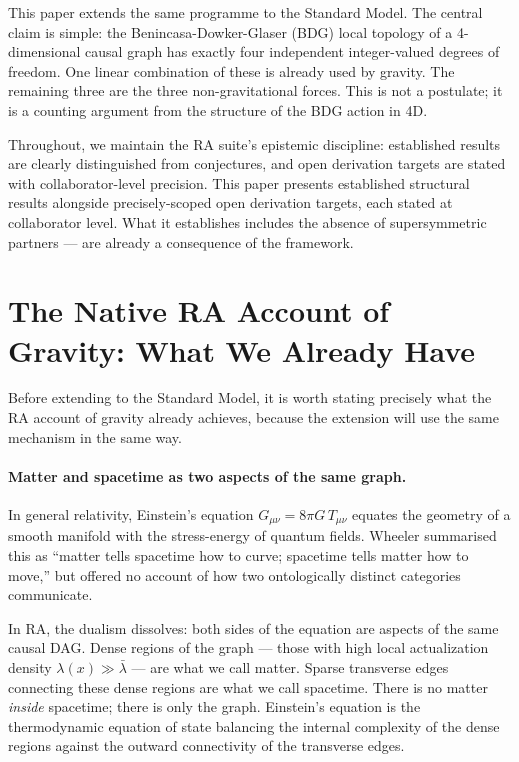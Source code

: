 \documentclass[11pt,a4paper]{article}
\begin{document}
This paper extends the same programme to the Standard Model. The central claim
is simple: the Benincasa-Dowker-Glaser (BDG) local topology of a 4-dimensional
causal graph has exactly four independent integer-valued degrees of freedom.
One linear combination of these is already used by gravity. The remaining
three are the three non-gravitational forces. This is not a postulate; it is
a counting argument from the structure of the BDG action in 4D.

Throughout, we maintain the RA suite's epistemic discipline: established results
are clearly distinguished from conjectures, and open derivation targets are
stated with collaborator-level precision. This paper presents established structural results alongside precisely-scoped
open derivation targets, each stated at collaborator level. What it establishes
includes the absence of supersymmetric
partners --- are already a consequence of the framework.

\section{The Native RA Account of Gravity: What We Already Have}
\label{sec:gravity_review}

Before extending to the Standard Model, it is worth stating precisely what the
RA account of gravity already achieves, because the extension will use the same
mechanism in the same way.

\paragraph{Matter and spacetime as two aspects of the same graph.}
In general relativity, Einstein's equation $G_{\mu\nu} = 8\pi G\,T_{\mu\nu}$
equates the geometry of a smooth manifold with the stress-energy of quantum
fields. Wheeler summarised this as ``matter tells spacetime how to curve;
spacetime tells matter how to move,'' but offered no account of how two
ontologically distinct categories communicate.

In RA, the dualism dissolves: both sides of the equation are aspects of the
same causal DAG. Dense regions of the graph --- those with high local
actualization density $\lambda(x) \gg \bar\lambda$ --- are what we call matter.
Sparse transverse edges connecting these dense regions are what we call
spacetime. There is no matter \emph{inside} spacetime; there is only the graph.
Einstein's equation is the thermodynamic equation of state balancing the
internal complexity of the dense regions against the outward connectivity of
the transverse edges.
\end{document}
